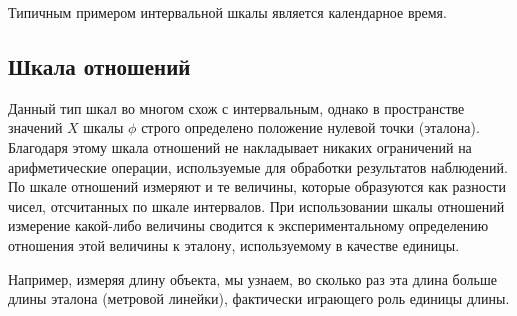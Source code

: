 \documentclass[a4paper,12pt]{extreport}
\begin{document}
\noindent Типичным примером интервальной шкалы является календарное время.


\subsection*{Шкала отношений} %
\label{sub:relative_scale}

Данный тип шкал во многом схож с интервальным, однако в пространстве значений $X$
шкалы $\phi$ строго определено положение нулевой точки (эталона). Благодаря этому
шкала отношений не накладывает никаких ограничений на арифметические операции,
используемые для обработки результатов наблюдений. По шкале отношений измеряют и
те величины, которые образуются как разности чисел, отсчитанных по шкале интервалов.
При использовании шкалы отношений измерение какой-либо величины сводится к
экспериментальному определению отношения этой величины к эталону, используемому в
качестве единицы.

Например, измеряя длину объекта, мы узнаем, во сколько раз эта длина больше длины
эталона (метровой линейки), фактически играющего роль единицы длины.





\end{document}
